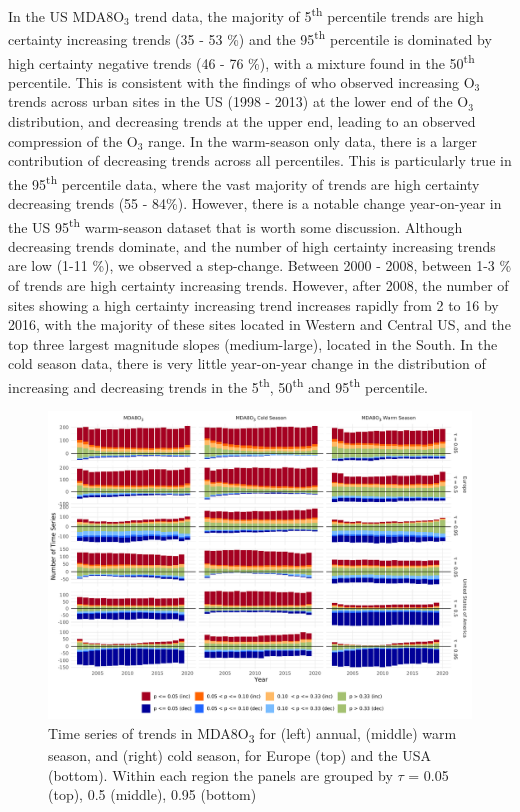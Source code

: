 \documentclass[journal abbreviation, manuscript]{copernicus}
\begin{document}
In the US MDA8O$_3$ trend data, the majority of 5\textsuperscript{th} percentile trends are high certainty increasing trends (35 - 53 \%) and the 95\textsuperscript{th} percentile is dominated by high certainty negative trends (46 - 76 \%), with a mixture found in the 50\textsuperscript{th} percentile. This is consistent with the findings of \cite{Simon_2015} who observed increasing O$_3$ trends across urban sites in the US (1998 - 2013) at the lower end of the O$_3$ distribution, and decreasing trends at the upper end, leading to an observed compression of the O$_3$ range. In the warm-season only data, there is a larger contribution of decreasing trends across all percentiles. This is particularly true in the 95\textsuperscript{th} percentile data, where the vast majority of trends are high certainty decreasing trends (55 - 84\%). However, there is a notable change year-on-year in the US 95\textsuperscript{th} warm-season dataset that is worth some discussion. Although decreasing trends dominate, and the number of high certainty increasing trends are low (1-11 \%), we observed a step-change. Between 2000 - 2008, between 1-3 \% of trends are high certainty increasing trends. However, after 2008, the number of sites showing a high certainty increasing trend increases rapidly from 2 to 16 by 2016, with the majority of these sites located in Western and Central US, and the top three largest magnitude slopes (medium-large), located in the South. In the cold season data, there is very little year-on-year change in the distribution of increasing and decreasing trends in the 5\textsuperscript{th}, 50\textsuperscript{th} and 95\textsuperscript{th} percentile.

\begin{figure}[h!]
\centering
\includegraphics[width=\textwidth]{figures/paper_figures/signifcance_bars.pdf}
\caption{Time series of trends in MDA8O\textsubscript{3} for (left) annual, (middle) warm season, and (right) cold season, for Europe (top) and the USA (bottom). Within each region the panels are grouped by $\tau$ = 0.05 (top), 0.5 (middle), 0.95 (bottom)}
\label{fig:p_bar_year_mda8_anom_combined}
\end{figure}
\end{document}
